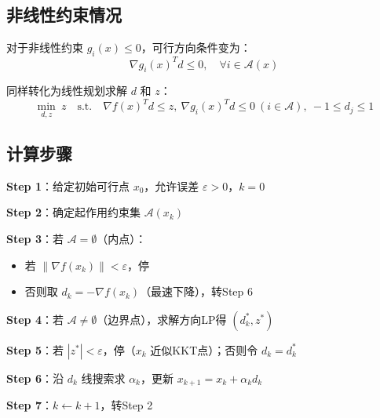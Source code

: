 \subsection{非线性约束情况}

对于非线性约束 $g_i(x) \leq 0$，可行方向条件变为：
\[
\nabla g_i(x)^T d \leq 0,\quad \forall i \in \mathcal{A}(x)
\]

同样转化为线性规划求解 $d$ 和 $z$：
\[
\min_{d, z}\ z\quad \text{s.t.}\quad \nabla f(x)^T d \leq z,\ \nabla g_i(x)^T d \leq 0\ (i \in \mathcal{A}),\ -1 \leq d_j \leq 1
\]

\subsection{计算步骤}

\begin{algobox}[可行方向法计算步骤]
\textbf{Step 1}：给定初始可行点 $x_0$，允许误差 $\varepsilon > 0$，$k = 0$

\textbf{Step 2}：确定起作用约束集 $\mathcal{A}(x_k)$

\textbf{Step 3}：若 $\mathcal{A} = \emptyset$（内点）：
\begin{itemize}
    \item 若 $\|\nabla f(x_k)\| < \varepsilon$，停
    \item 否则取 $d_k = -\nabla f(x_k)$（最速下降），转Step 6
\end{itemize}

\textbf{Step 4}：若 $\mathcal{A} \neq \emptyset$（边界点），求解方向LP得 $(d_k^*, z^*)$

\textbf{Step 5}：若 $|z^*| < \varepsilon$，停（$x_k$ 近似KKT点）；否则令 $d_k = d_k^*$

\textbf{Step 6}：沿 $d_k$ 线搜索求 $\alpha_k$，更新 $x_{k+1} = x_k + \alpha_k d_k$

\textbf{Step 7}：$k \leftarrow k+1$，转Step 2
\end{algobox}

